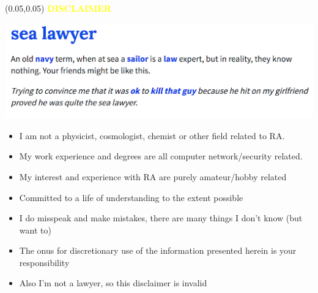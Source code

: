 \documentclass[aspectratio=169]{beamer} %
\begin{document}
\begin{frame}{}
	\setlength{\TPHorizModule}{\textwidth}
	\setlength{\TPVertModule}{\textwidth}
	\begin{textblock}{0.74}(0.05,0.05)
		\bfseries\huge\textcolor{yellow}{DISCLAIMER}
	\end{textblock}

	\begin{flushright}
		\includegraphics[width=0.65\linewidth, height=0.3\textheight]{../images/sea_lawyer.png}
	\end{flushright}

	\begin{itemize}
		\color{yellow}
		\item I am not a physicist, cosmologist, chemist or other field related to RA.
		\item My work experience and degrees are all computer network/security related.
		\item My interest and experience with RA are purely amateur/hobby related
		\item Committed to a life of understanding to the extent possible
		\item I do misspeak and make mistakes, there are many things I don’t know (but want to)
		\item The onus for discretionary use of the information presented herein is your responsibility
		\item Also I’m not a lawyer, so this disclaimer is invalid
	\end{itemize}


\end{frame}
\end{document}
